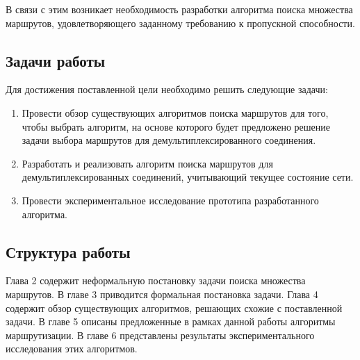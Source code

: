 \documentclass[a4paper]{article}
\begin{document}
В связи с этим возникает необходимость разработки алгоритма поиска множества маршрутов, удовлетворяющего заданному требованию к пропускной способности.

\subsection{Задачи работы}
Для достижения поставленной цели необходимо решить следующие задачи:
\begin{enumerate}
\item Провести обзор существующих алгоритмов поиска маршрутов для того, чтобы выбрать алгоритм, на основе которого будет предложено решение задачи выбора маршрутов для демультиплексированного соединения.
\item Разработать и реализовать алгоритм поиска маршрутов для демультиплексированных соединений, учитывающий текущее состояние сети.
\item Провести экспериментальное исследование прототипа разработанного алгоритма.
\end{enumerate}

\subsection{Структура работы}
Глава 2 содержит неформальную постановку задачи поиска множества маршрутов. В главе 3 приводится формальная постановка задачи. Глава 4 содержит обзор существующих алгоритмов, решающих схожие с поставленной задачи. В главе 5 описаны предложенные в рамках данной работы алгоритмы маршрутизации. В главе 6 представлены результаты экспериментального исследования этих алгоритмов.



\newpage
\end{document}
